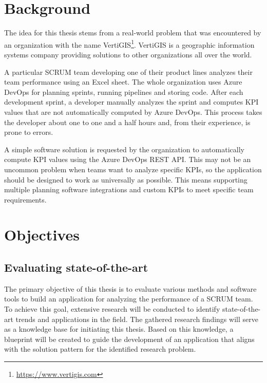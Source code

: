 \section{Background}\label{background-section}

The idea for this thesis stems from a real-world problem that was encountered by an 
organization with the name VertiGIS\footnote{\url{https://www.vertigis.com}}. 
VertiGIS is a geographic information systems company
providing solutions to other organizations all over the world.

A particular SCRUM team developing one of their product
lines analyzes their team performance using an Excel sheet. 
The whole organization uses Azure DevOps for planning sprints, running pipelines and storing code.
After each development sprint, a developer manually analyzes the sprint and computes KPI values
that are not automatically computed by Azure DevOps.
This process takes the developer about one to one and a half hours and, from their experience, is prone to errors.

A simple software solution is requested by the organization to automatically compute KPI values using the 
Azure DevOps REST API.
This may not be an uncommon problem when teams want to analyze specific KPIs, so the application should be 
designed to work as universally as possible. 
This means supporting multiple planning software integrations and custom KPIs to meet specific team requirements.

\section{Objectives} \label{Chapter1-Objectives}

\subsection{Evaluating state-of-the-art}

The primary objective of this thesis is to evaluate various methods and software tools to 
build an application for analyzing the performance of a SCRUM team.
To achieve this goal, extensive research will be conducted to identify 
state-of-the-art trends and applications in the field. 
The gathered research findings will serve as a knowledge base for initiating this thesis. 
Based on this knowledge, a blueprint will be created to guide the development 
of an application that aligns with the solution pattern for the identified research problem.

